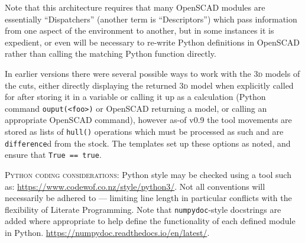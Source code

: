 \documentclass{ltxdoc}
\begin{document}
\noindent Note that this architecture requires that many OpenSCAD modules are essentially ``Dispatchers'' (another term is ``Descriptors'') which pass information from one aspect of the environment to another, but in some instances it is expedient, or even will be necessary to re-write Python definitions in OpenSCAD rather than calling the matching Python function directly.

In earlier versions there were several possible ways to work with the \textsc{3d} models of the cuts, either directly displaying the returned \textsc{3d} model when explicitly called for after storing it in a variable or calling it up as a calculation (Python command \verb|ouput(<foo>)| or OpenSCAD returning a model, or calling an appropriate OpenSCAD command), however as-of v0.9 the tool movements are stored as lists of \verb|hull()| operations which must be processed as such and are \verb|difference|d from the stock. The templates set up these options as noted, and ensure that \verb|True == true|.



\smallskip

\noindent\textsc{Python coding considerations:} Python style may be checked using a tool such as: \url{https://www.codewof.co.nz/style/python3/}. Not all conventions will necessarily be adhered to --- limiting line length in particular conflicts with the flexibility of Literate Programming. Note that \verb|numpydoc|-style docstrings are added where appropriate to help define the functionality of each defined module in Python. \url{https://numpydoc.readthedocs.io/en/latest/}.
\end{document}
